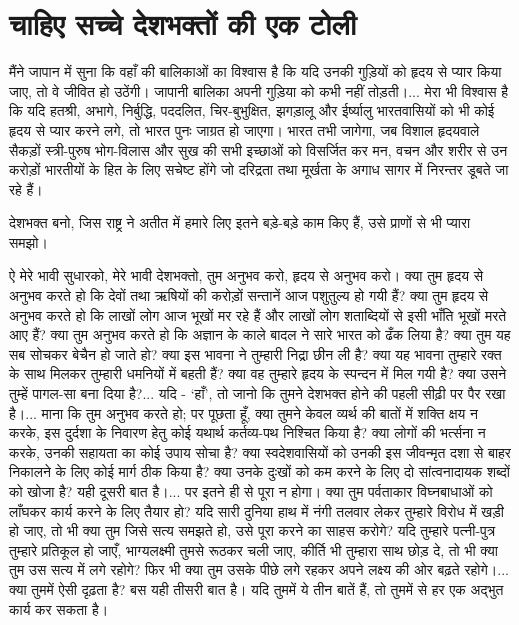 \section*{चाहिए सच्चे देशभक्तों की एक टोली}


मैंने जापान में सुना कि वहाँ की बालिकाओं का विश्वास है कि यदि उनकी गुड़ियों को हृदय से प्यार किया जाए, तो वे जीवित हो उठेंगी। जापानी बालिका अपनी गुड़िया को कभी नहीं तोड़ती।... मेरा भी विश्वास है कि यदि हतश्री, अभागे, निर्बुद्धि, पददलित, चिर-बुभुक्षित, झगड़ालू और ईर्ष्यालु भारतवासियों को भी कोई हृदय से प्यार करने लगे, तो भारत पुनः जाग्रत हो जाएगा। भारत तभी जागेगा, जब विशाल हृदयवाले सैकड़ों स्त्री-पुरुष भोग-विलास और सुख की सभी इच्छाओं को विसर्जित कर मन, वचन और शरीर से उन करोड़ों भारतीयों के हित के लिए सचेष्ट होंगे जो दरिद्रता तथा मूर्खता के अगाध सागर में निरन्तर डूबते जा रहे हैं। 

देशभक्त बनो, जिस राष्ट्र ने अतीत में हमारे लिए इतने बड़े-बड़े काम किए हैं, उसे प्राणों से भी प्यारा समझो। 

ऐ मेरे भावी सुधारको, मेरे भावी देशभक्तो, तुम अनुभव करो, हृदय से अनुभव करो। क्या तुम हृदय से अनुभव करते हो कि देवों तथा ऋषियों की करोड़ों सन्तानें आज पशुतुल्य हो गयी हैं? क्या तुम हृदय से अनुभव करते हो कि लाखों लोग आज भूखों मर रहे हैं और लाखों लोग शताब्दियों से इसी भाँति भूखों मरते आए हैं? क्या तुम अनुभव करते हो कि अज्ञान के काले बादल ने सारे भारत को ढँक लिया है? क्या तुम यह सब सोचकर बेचैन हो जाते हो? क्या इस भावना ने तुम्हारी निद्रा छीन ली है? क्या यह भावना तुम्हारे रक्त के साथ मिलकर तुम्हारी धमनियों में बहती हैं? क्या वह तुम्हारे हृदय के स्पन्दन में मिल गयी है? क्या उसने तुम्हें पागल-सा बना दिया है?... यदि - ‘हाँ’, तो जानो कि तुमने देशभक्त होने की पहली सीढ़ी पर पैर रखा है।... माना कि तुम अनुभव करते हो; पर पूछता हूँ, क्या तुमने केवल व्यर्थ की बातों में शक्ति क्षय न करके, इस दुर्दशा के निवारण हेतु कोई यथार्थ कर्तव्य-पथ निश्चित किया है? क्या लोगों की भर्त्सना न करके, उनकी सहायता का कोई उपाय सोचा है? क्या स्वदेशवासियों को उनकी इस जीवन्मृत दशा से बाहर निकालने के लिए कोई मार्ग ठीक किया है? क्या उनके दुःखों को कम करने के लिए दो सांत्वनादायक शब्दों को खोजा है? यही दूसरी बात है।... पर इतने ही से पूरा न होगा। क्या तुम पर्वताकार विघ्नबाधाओं को लाँघकर कार्य करने के लिए तैयार हो? यदि सारी दुनिया हाथ में नंगी तलवार लेकर तुम्हारे विरोध में खड़ी हो जाए, तो भी क्या तुम जिसे सत्य समझते हो, उसे पूरा करने का साहस करोगे? यदि तुम्हारे पत्नी-पुत्र तुम्हारे प्रतिकूल हो जाएँ, भाग्यलक्ष्मी तुमसे रूठकर चली जाए, कीर्ति भी तुम्हारा साथ छोड़ दे, तो भी क्या तुम उस सत्य में लगे रहोगे? फिर भी क्या तुम उसके पीछे लगे रहकर अपने लक्ष्य की ओर बढ़ते रहोगे।... क्या तुममें ऐसी दृढ़ता है? बस यही तीसरी बात है। यदि तुममें ये तीन बातें हैं, तो तुममें से हर एक अद्भुत कार्य कर सकता है। 

